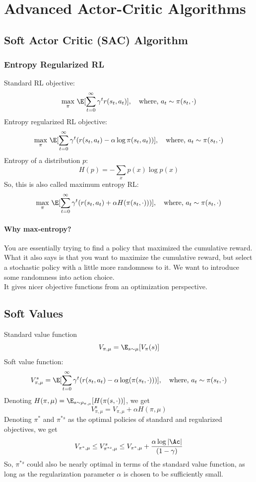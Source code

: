 \chapter{Advanced Actor-Critic Algorithms}
\section{Soft Actor Critic (SAC) Algorithm}
\subsection{Entropy Regularized RL}
Standard RL objective:
\[
  \max_\pi \, \E[\sum_{t=0}^{\infty} \gamma^t r(s_t, a_t) ], \quad \text{where, } a_t \sim \pi(s_t, \cdot)
\]
Entropy regularized RL objective:
\[
  \max_{\pi} \, \E[\sum_{t=0}^{\infty} \gamma^t (r(s_t, a_t) - \alpha \log \pi(s_t, a_t))], \quad \text{where, } a_t \sim \pi(s_t, \cdot)
\]
Entropy of a distribution $p$:
\[
  H(p) = - \sum_{x} p(x) \log p(x)
\]
So, this is also called maximum entropy RL:
\[
  \max_{\pi} \, \E [\sum_{t=0}^{\infty} \gamma^t (r(s_t,a_t) + \alpha H(\pi(s_t, \cdot)))], \quad \text{where, } a_t \sim \pi(s_t, \cdot)
\]
\subsubsection{Why max-entropy?}
You are essentially trying to find a policy that maximized the cumulative reward. What it also says is
that you want to maximize the cumulative reward, but select a stochastic policy with a little more randomness
to it. We want to introduce some randomness into action choice. \\

\noindent It gives nicer objective functions from an optimization perspective.

\section{Soft Values}
Standard value function
\[
  V_{\pi, \mu} = \E_{s\sim \mu} [V_\pi (s)]
\]
Soft value function:
\[
  V_{\pi,\mu}^s = \E[\sum_{t=0}^{\infty} \gamma^t (r(s_t, a_t) - \alpha \log (\pi(s_t, \cdot)))], \quad \text{where, } a_t \sim \pi(s_t, \cdot)
\]
Denoting $H(\pi, \mu) = \E_{s\sim \rho_{\pi,\mu}} [H(\pi(s, \cdot))]$, we get
\[
  V_{\pi,\mu}^s = V_{\pi,\mu} + \alpha H(\pi,\mu)
\]
Denoting $\pi^*$ and $\pi^{*s}$ as the optimal policies of standard and regularized objectives, we get
\[
  V_{\pi^*, \mu} \leq V_{\pi^{*s}, \mu}^s \leq V_{\pi^*, \mu} + \frac{\alpha \log |\Ac|}{(1-\gamma)}
\]
So, $\pi^{*s}$ could also be nearly optimal in terms of the standard value function, as long as the regularization parameter $\alpha$ is chosen
to be sufficiently small.

